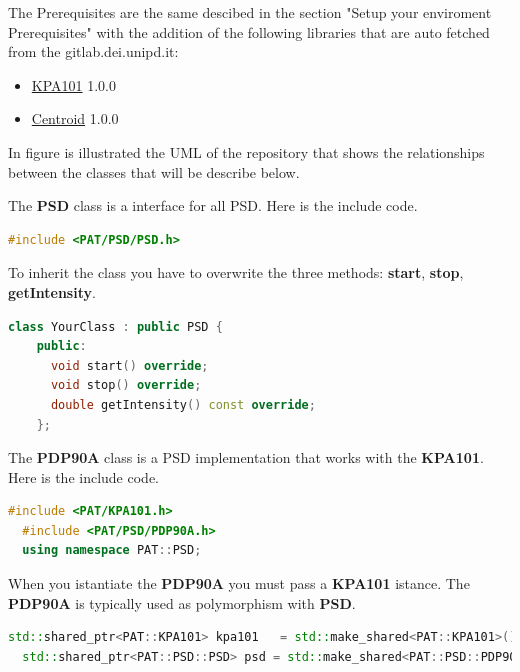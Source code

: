 
The Prerequisites are the same descibed in the section "Setup your enviroment Prerequisites"  with the addition of the following libraries that are auto fetched from the gitlab.dei.unipd.it:

\begin{itemize}
  \tightlist
  \item
        \href{https://gitlab.dei.unipd.it/PAT/KPA101.git}{KPA101} 1.0.0
  \item
        \href{https://gitlab.dei.unipd.it/PAT/Centroid.git}{Centroid} 1.0.0
\end{itemize}


In figure  is illustrated the UML of the repository that shows the relationships between the classes that will be describe below.



The \textbf{PSD} class is a interface for all PSD. Here is the include
code.

\begin{lstlisting}[language=c++, gobble=2]
  #include <PAT/PSD/PSD.h>
\end{lstlisting}

To inherit the class you have to overwrite the three methods:
\textbf{start}, \textbf{stop}, \textbf{getIntensity}.

\begin{lstlisting}[language=c++, gobble=2]
  class YourClass : public PSD {
    public:
      void start() override;
      void stop() override;
      double getIntensity() const override;
    };    
\end{lstlisting}


The \textbf{PDP90A} class is a PSD implementation that works with the
\textbf{KPA101}. Here is the include code.

\begin{lstlisting}[language=c++, gobble=2]
  #include <PAT/KPA101.h>
  #include <PAT/PSD/PDP90A.h>
  using namespace PAT::PSD;  
\end{lstlisting}

When you istantiate the \textbf{PDP90A} you must pass a \textbf{KPA101}
istance. The \textbf{PDP90A} is typically used as polymorphism with
\textbf{PSD}.

\begin{lstlisting}[language=c++, gobble=2]
  std::shared_ptr<PAT::KPA101> kpa101   = std::make_shared<PAT::KPA101>();
  std::shared_ptr<PAT::PSD::PSD> psd = std::make_shared<PAT::PSD::PDP90A>(kpa101);
\end{lstlisting}

